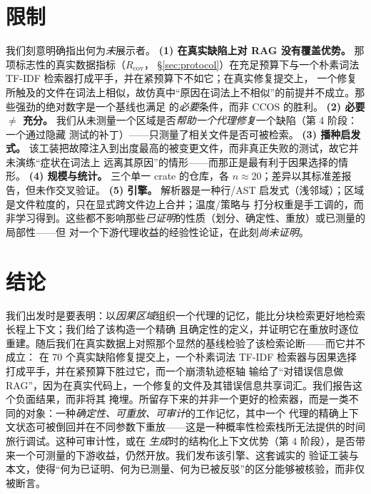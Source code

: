 \documentclass[11pt]{ctexart}
\begin{document}
\section{限制}

我们刻意明确指出何为\emph{未}展示者。
\textbf{(1) 在真实缺陷上对 RAG 没有覆盖优势。} 那项标志性的真实数据指标（$R_{\mathrm{cov}}$，
\S\ref{sec:protocol}）在充足预算下与一个朴素词法 TF-IDF 检索器打成平手，并在紧预算下不如它；在真实修复提交上，
一个修复所触及的文件在词法上相似，故仿真中“原因在词法上不相似”的前提并不成立。那些强劲的绝对数字是一个基线也满足
的\emph{必要}条件，而非 CCOS 的胜利。
\textbf{(2) 必要 $\neq$ 充分。} 我们从未测量一个区域是否\emph{帮助一个代理修复}一个缺陷（第 4 阶段：一个通过隐藏
测试的补丁）——只测量了相关文件是否可被检索。
\textbf{(3) 播种启发式。} 该工装把故障注入到出度最高的被变更文件，而非真正失败的测试，故它并未演练“症状在词法上
远离其原因”的情形——而那正是最有利于因果选择的情形。
\textbf{(4) 规模与统计。} 三个单一 crate 的仓库，各 $n\!\approx\!20$；差异以其标准差报告，但未作交叉验证。
\textbf{(5) 引擎。} 解析器是一种行/AST 启发式（浅邻域）；区域是文件粒度的，只在显式跨文件边上合并；温度/策略与
打分权重是手工调的，而非学习得到。这些都不影响那些\emph{已证明}的性质（划分、确定性、重放）或已测量的局部性——但
对一个下游代理收益的经验性论证，在此刻\emph{尚未证明}。

\section{结论}

我们出发时是要表明：以\emph{因果区域}组织一个代理的记忆，能比分块检索更好地检索长程上下文；我们给了该构造一个精确
且确定性的定义，并证明它在重放时逐位重建。随后我们在真实数据上对照那个显然的基线检验了该检索论断——而它并不成立：
在 $70$ 个真实缺陷修复提交上，一个朴素词法 TF-IDF 检索器与因果选择打成平手，并在紧预算下胜过它，而一个崩溃轨迹枢轴
输给了“对错误信息做 RAG”，因为在真实代码上，一个修复的文件及其错误信息共享词汇。我们报告这个负面结果，而非将其
掩埋。所留存下来的并非一个更好的检索器，而是一类不同的对象：一种\emph{确定性、可重放、可审计}的工作记忆，其中一个
代理的精确上下文状态可被倒回并在不同参数下重放——这是一种概率性检索栈所无法提供的时间旅行调试。这种可审计性，或在
\emph{生成}时的结构化上下文优势（第 4 阶段），是否带来一个可测量的下游收益，仍然开放。我们发布该引擎、这套诚实的
验证工装与本文，使得“何为已证明、何为已测量、何为已被反驳”的区分能够被核验，而非仅被断言。
\end{document}
